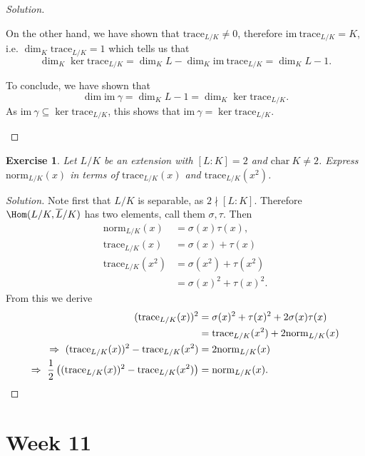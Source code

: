 \documentclass[a4paper,10pt,reqno]{amsart}
\newtheorem{ex}{Exercise}[section]
\newenvironment{sol}
  {\renewcommand\qedsymbol{$\blacksquare$}\begin{proof}[Solution]}
  {\end{proof}}
\begin{document}
\begin{sol}
\begin{enumerate}[label=(\roman*)]
        On the other hand, we have shown that $\mathrm{trace}_{L/K} \neq 0$, therefore $\mathrm{im}\  \mathrm{trace}_{L/K} = K$, i.e. $\dim_K \mathrm{trace}_{L/K} = 1$ which tells us that
        \[
        \dim_K \ker \mathrm{trace}_{L/K} = \dim_KL - \dim_K \mathrm{im} \ \mathrm{trace}_{L/K} = \dim_KL - 1.
        \]

        To conclude, we have shown that
        \[
        \dim \mathrm{im}\ \gamma  = \dim_KL - 1 = \dim_K \ker \mathrm{trace}_{L/K}.
        \]
        As $\mathrm{im}\ \gamma \subseteq \ker \mathrm{trace}_{L/K}$, this shows that $\mathrm{im}\ \gamma = \ker \mathrm{trace}_{L/K}$.\qedhere
    \end{enumerate}
\end{sol}


\begin{ex}
\label{10.5}
    Let $L/K$ be an extension with $[L:K] = 2$ and $\mathrm{char}\ K \neq 2$. Express $\mathrm{norm}_{L/K}(x)$ in terms of $\mathrm{trace}_{L/K}(x)$ and $\mathrm{trace}_{L/K}(x^2)$.
\end{ex}
\begin{sol}
    Note first that $L/K$ is separable, as $2 \nmid [L:K]$. Therefore $\Hom(L/K,\overline{L}/K)$ has two elements, call them $\sigma,\tau$. Then
    \begin{align*}
        \mathrm{norm}_{L/K}(x) & = \sigma(x)\tau(x), \\
        \mathrm{trace}_{L/K}(x) & = \sigma(x)+ \tau(x) \\
         \mathrm{trace}_{L/K}(x^2) & = \sigma(x^2) + \tau(x^2) \\
         & = \sigma(x)^2 + \tau(x)^2.
    \end{align*}
    From this we derive
    \begin{align*}
        (\mathrm{trace}_{L/K}(x))^2 & = \sigma(x)^2 + \tau(x)^2 + 2 \sigma(x)\tau(x) \\
        & = \mathrm{trace}_{L/K}(x^2) + 2 \mathrm{norm}_{L/K}(x) \\
       \Rightarrow \ (\mathrm{trace}_{L/K}(x))^2 - \mathrm{trace}_{L/K}(x^2) & = 2 \mathrm{norm}_{L/K}(x) \\
       \Rightarrow \ \frac{1}{2} \left( (\mathrm{trace}_{L/K}(x))^2 - \mathrm{trace}_{L/K}(x^2) \right) & =  \mathrm{norm}_{L/K}(x).\qedhere
    \end{align*}
\end{sol}

\newpage

\section{Week 11}
\end{document}
